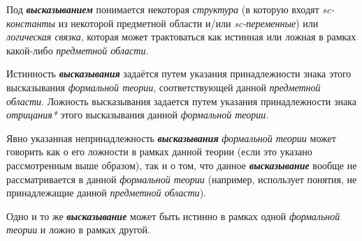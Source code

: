 Под \textbf{\textit{высказыванием}} понимается некоторая \textit{структура} (в которую входят \textit{sc-константы} из некоторой предметной области и/или \textit{sc-переменные}) или \textit{логическая связка}, которая может трактоваться как истинная или ложная в рамках какой-либо \textit{предметной области}.

Истинность \textbf{\textit{высказывания}} задаётся путем указания принадлежности знака этого высказывания \textit{формальной теории}, соответствующей данной \textit{предметной области}. Ложность высказывания задается путем указания принадлежности знака \textit{отрицания*} этого высказывания данной \textit{формальной теории}.

Явно указанная непринадлежность \textbf{\textit{высказывания}} \textit{формальной теории} может говорить как о его ложности в рамках данной теории (если это указано рассмотренным выше образом), так и о том, что данное  \textbf{\textit{высказывание}} вообще не рассматривается в данной \textit{формальной теории} (например, использует понятия, не принадлежащие данной \textit{предметной области}).

Одно и то же \textbf{\textit{высказывание}} может быть истинно в рамках одной \textit{формальной теории} и ложно в рамках другой.



